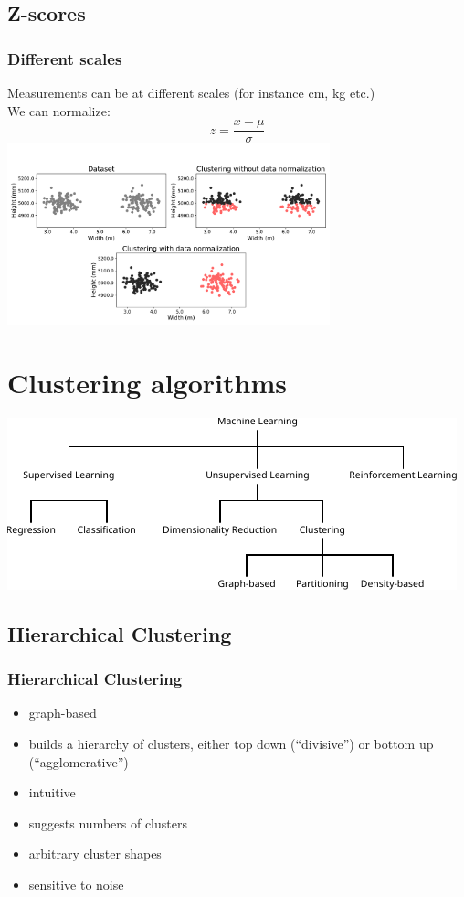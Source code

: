 \documentclass[Nike]{tuberlinbeamer}
\begin{document}
\subsection{Z-scores}
\begin{frame}
  \frametitle{Different scales}
  Measurements can be at different scales (for instance cm, kg etc.)\\
  We can normalize:
  \begin{equation*}
    z = \frac{x - \mu}{\sigma}
  \end{equation*}
  \pause
  \centering\includegraphics[width=0.7\textwidth]{normalization_clustering.png}
  \tiny \cite{guerin_clustering_2017}
\end{frame}


\section{Clustering algorithms}
\begin{frame}
  \vfill
  \centering\includegraphics[width=\textwidth]{ml_schema_ext}
  \vfill
\end{frame}

\subsection{Hierarchical Clustering}
\begin{frame}
  \frametitle{Hierarchical Clustering}
  \begin{itemize}[<+->]
    \item graph-based
    \item builds a hierarchy of clusters, either top down (``divisive'') or bottom up (``agglomerative'')
    \item intuitive
    \item suggests numbers of clusters
    \item arbitrary cluster shapes
    \item sensitive to noise
  \end{itemize}
\end{frame}
\end{document}

